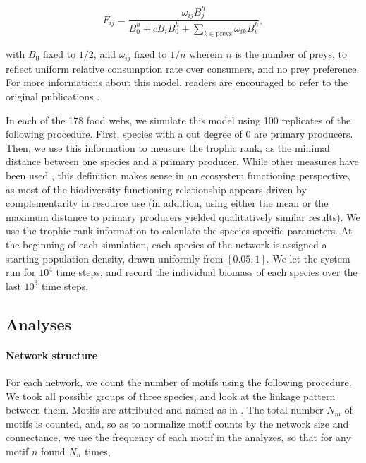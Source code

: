 \documentclass[12pt]{article}
\begin{document}
\begin{equation}
	F_{ij} = \frac{\omega_{ij}B_{j}^h}{B_{0}^{h}+cB_{i}B_{0}^{h}+\sum_{k\in \mathrm{preys}}\omega_{ik}B_{i}^{h}},
\end{equation}

with $B_{0}$ fixed to $1/2$, and $\omega_{ij}$ fixed to $1/n$ wherein $n$ is the
number of preys, to reflect uniform relative consumption rate over consumers,
and no prey preference. For more informations about this model, readers are
encouraged to refer to the original publications
\parencite{Brose2006a,Williams2007}.

In each of the 178 food webs, we simulate this model using 100 replicates of the
following procedure. First, species with a out degree of 0 are primary
producers. Then, we use this information to measure the trophic rank, as the
minimal distance between one species and a primary producer. While other
measures have been used \parencite{Post2002}, this definition makes sense in an
ecosystem functioning perspective, as most of the biodiversity-functioning
relationship appears driven by complementarity in resource use (in addition,
using either the mean or the maximum distance to primary producers yielded
qualitatively similar results). We use the trophic rank information to calculate
the species-specific parameters. At the beginning of each simulation, each
species of the network is assigned a starting population density, drawn
uniformly from $[0.05, 1]$. We let the system run for $10^{4}$ time steps, and
record the individual biomass of each species over the last $10^{3}$ time steps.

\subsection{Analyses}

\paragraph{Network structure}

For each network, we count the number of motifs using the following procedure.
We took all possible groups of three species, and look at the linkage pattern
between them. Motifs are attributed and named as in \textcite{Stouffer2007}. The
total number $N_{m}$ of motifs is counted, and, so as to normalize motif counts
by the network size and connectance, we use the frequency of each motif in the
analyzes, so that for any motif $n$ found $N_{n}$ times,
\end{document}
